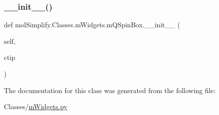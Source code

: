 \subsubsection{\texorpdfstring{\+\_\+\+\_\+init\+\_\+\+\_\+()}{\_\_init\_\_()}}
{\footnotesize\ttfamily def mol\+Simplify.\+Classes.\+m\+Widgets.\+m\+Q\+Spin\+Box.\+\_\+\+\_\+init\+\_\+\+\_\+ (\begin{DoxyParamCaption}\item[{}]{self,  }\item[{}]{ctip }\end{DoxyParamCaption})}



The documentation for this class was generated from the following file\+:\begin{DoxyCompactItemize}
\item 
Classes/\hyperlink{mWidgets_8py}{m\+Widgets.\+py}\end{DoxyCompactItemize}
